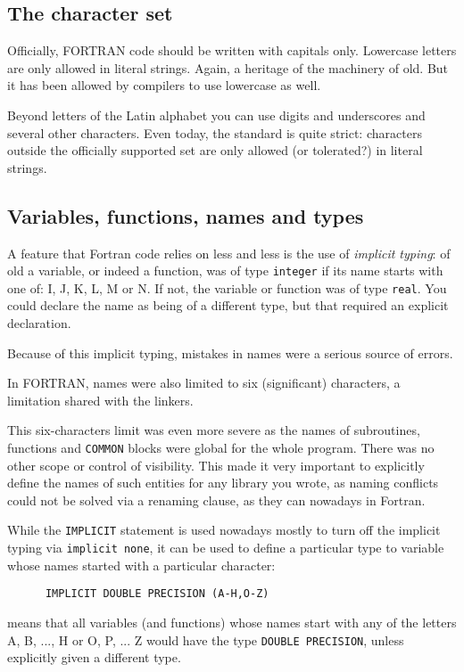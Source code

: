 \subsection{The character set}
Officially, FORTRAN code should be written with capitals only. Lowercase letters are only
allowed in literal strings. Again, a heritage of the machinery of old. But it has been
allowed by compilers to use lowercase as well.

Beyond letters of the Latin alphabet you can use digits and underscores and several other characters.
Even today, the standard is quite strict: characters outside the officially supported set are only
allowed (or tolerated?) in literal strings.


\subsection{Variables, functions, names and types}
A feature that Fortran code relies on less and less is the use of \emph{implicit typing}: of old
a variable, or indeed a function, was of type \verb+integer+ if its name starts with one of: I, J, K, L, M or N.
If not, the variable or function was of type \verb+real+. You could declare the name as being of a different type, but
that required an explicit declaration.

Because of this implicit typing, mistakes in names were a serious source of errors.

In FORTRAN, names were also limited to six (significant) characters, a limitation shared with the linkers.

This six-characters limit was even more severe as the names of subroutines, functions and \verb+COMMON+ blocks
were global for the whole program. There was no other scope or control of visibility. This made it
very important to explicitly define the names of such entities for any library you wrote, as naming conflicts
could not be solved via a renaming clause, as they can nowadays in Fortran.

While the \verb+IMPLICIT+ statement is used nowadays mostly to turn off the implicit typing via \verb+implicit none+,
it can be used to define a particular type to variable whose names started with a particular character:
\begin{verbatim}
      IMPLICIT DOUBLE PRECISION (A-H,O-Z)
\end{verbatim}

\noindent means that all variables (and functions) whose names start with any of the letters A, B, ..., H or
O, P, ... Z would have the type \verb+DOUBLE PRECISION+, unless explicitly given a different type.

